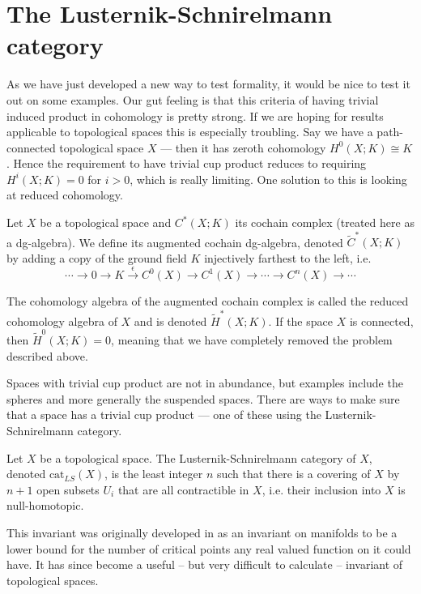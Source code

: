 
\section{The Lusternik-Schnirelmann category}

As we have just developed a new way to test formality, it would be nice to test it out on 
some examples. Our gut feeling is that this criteria of having trivial induced product in 
cohomology is pretty strong. If we are hoping for results applicable to topological spaces 
this is especially troubling. Say we have a path-connected topological space $X$ — then it 
has zeroth cohomology $H^0(X;K)\cong K$. Hence the requirement to have trivial cup product 
reduces to requiring $H^i(X;K)=0$ for $i>0$, which is really limiting. One solution to this 
is looking at reduced cohomology.

\begin{definition}
    Let $X$ be a topological space and $C^*(X;K)$ its cochain complex (treated here as a 
    dg-algebra). We define its augmented cochain dg-algebra, denoted 
    $\widetilde{C}^*(X;K)$ by adding a copy of the ground field $K$ injectively farthest 
    to the left, i.e.
    $$\cdots \longrightarrow 0 \longrightarrow K \overset{\epsilon}\longrightarrow C^0(X)\longrightarrow C^1(X) \longrightarrow \cdots \longrightarrow C^n(X) \longrightarrow \cdots $$
\end{definition} 

The cohomology algebra of the augmented cochain complex is called the reduced cohomology 
algebra of $X$ and is denoted $\widetilde{H}^*(X;K)$. If the space $X$ is connected, 
then $\widetilde{H}^0(X;K)=0$, meaning that we have completely removed the problem 
described above.

Spaces with trivial cup product are not in abundance, but examples include the spheres 
and more generally the suspended spaces. There are ways to make sure that a space has a 
trivial cup product — one of these using the Lusternik-Schnirelmann category. 

\begin{definition}
    Let $X$ be a topological space. The Lusternik-Schnirelmann category of $X$, denoted 
    $\text{cat}_{LS}(X)$, is the least integer $n$ such that there is a covering of $X$ 
    by $n+1$ open subsets $U_i$ that are all contractible in $X$, i.e. their inclusion 
    into $X$ is null-homotopic.    
\end{definition}

This invariant was originally developed in \cite{lscat} as an invariant on manifolds to be 
a lower bound for the number of critical points any real valued function on it could have. 
It has since become a useful – but very difficult to calculate – invariant of topological 
spaces. 

